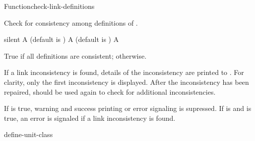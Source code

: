 \documentclass[10pt,twoside,english,pdftex]{article}
\begin{document}
\W\entities
\T\clearpage


\begin{functiondoc}{Function}{check-link-definitions}{%
    }
%

\fnsyntax

\fnpurpose Check for consistency among  definitions of
.

\fnpackage {}

\fnmodule {}

\fnargs
\begin{args}{silent}
\arg[silent] A  (default is \nil)
\arg[errorp] A  (default is \nil) 
\arg[boolean] A 
\end{args}

\fnreturns True if all  definitions are consistent; \nil{}
otherwise.

\fndescription If a link inconsistency is found, details of the inconsistency
are printed to .  For clarity, only the first
inconsistency is displayed.  After the inconsistency has been repaired,
 should be used again to check for
additional inconsistencies.

If  is true, warning and success printing or error signaling is
supressed.  If  is \nil{} and  is true, an error
is signaled if a link inconsistency is found.

\begin{alsos}{define-unit-class}
\end{alsos}


\end{functiondoc}
\end{document}
